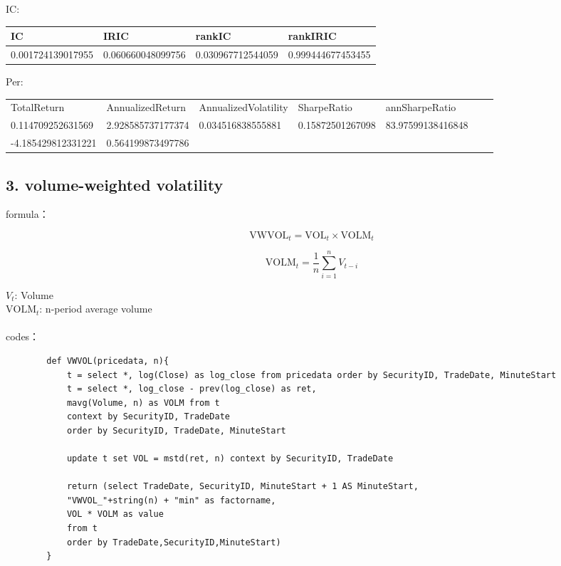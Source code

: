 \documentclass[10pt,a4paper]{article}
\begin{document}
	IC:
	\begin{table}[H]
		\begin{tabular}{@{}|l|l|l|l|@{}}
			\toprule
			IC                & IRIC              & rankIC            & rankIRIC          \\ \midrule
			0.001724139017955 & 0.060660048099756 & 0.030967712544059 & 0.999444677453455 \\ \bottomrule
		\end{tabular}
	\end{table}
	
	Per:
	\begin{table}[H]
		\begin{tabular}{@{}|l|l|lllll@{}}
			\cmidrule(r){1-5}
			TotalReturn        & AnnualizedReturn  & \multicolumn{1}{l|}{AnnualizedVolatility} & \multicolumn{1}{l|}{SharpeRatio}      & \multicolumn{1}{l|}{annSharpeRatio}    &  &  \\ \cmidrule(r){1-5}
			0.114709252631569  & 2.928585737177374 & \multicolumn{1}{l|}{0.034516838555881}    & \multicolumn{1}{l|}{0.15872501267098} & \multicolumn{1}{l|}{83.97599138416848} &  &  \\ \cmidrule(r){1-2}
			-4.185429812331221 & 0.564199873497786 &                                           &                                       &                                        &  &  \\ \cmidrule(r){1-2}
		\end{tabular}
	\end{table}
	
	\subsection*{3. volume-weighted volatility}
	
	formula：
	
	\[
	\text{VWVOL}_{t} = \text{VOL}_{t} \times \text{VOLM}_{t}
	\]
	
	\[
	\text{VOLM}_{t} = \frac{1}{n} \sum_{i=1}^{n} V_{t-i}
	\]
	
	$V_{t}$: Volume \\
	\indent $\text{VOLM}_{t}$: n-period average volume
	\\
	\\
	\indent codes：
	\begin{lstlisting}
		def VWVOL(pricedata, n){
			t = select *, log(Close) as log_close from pricedata order by SecurityID, TradeDate, MinuteStart
			t = select *, log_close - prev(log_close) as ret,
			mavg(Volume, n) as VOLM from t 
			context by SecurityID, TradeDate
			order by SecurityID, TradeDate, MinuteStart
			
			update t set VOL = mstd(ret, n) context by SecurityID, TradeDate
			
			return (select TradeDate, SecurityID, MinuteStart + 1 AS MinuteStart, 
			"VWVOL_"+string(n) + "min" as factorname, 
			VOL * VOLM as value
			from t 
			order by TradeDate,SecurityID,MinuteStart)
		}
	\end{lstlisting}
	
\end{document}

